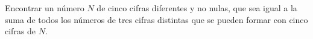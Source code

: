 Encontrar un número $N$ de cinco cifras diferentes y no nulas, que sea igual a la suma de todos los números de tres cifras distintas que se pueden formar con cinco cifras de $N$. 